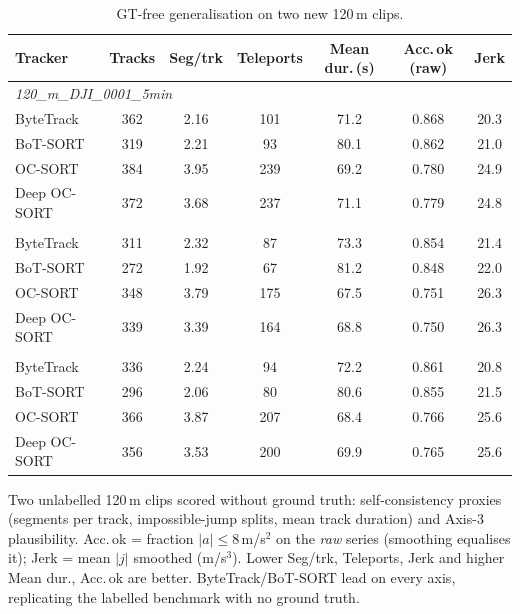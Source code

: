\begin{table}[ht]
  \centering
  \caption{GT-free generalisation on two new 120\,m clips.}
  \label{tab:gtfree}
  \begin{tabular}{lcccccc}
    \toprule
    Tracker & Tracks & Seg/trk & Teleports & Mean dur.\,(s) & Acc.\,ok (raw) & Jerk \\
    \midrule
    \multicolumn{7}{l}{\textit{120\_m\_DJI\_0001\_5min}} \\
    \quad ByteTrack & 362 & 2.16 & 101 & 71.2 & 0.868 & 20.3 \\
    \quad BoT-SORT & 319 & 2.21 & 93 & 80.1 & 0.862 & 21.0 \\
    \quad OC-SORT & 384 & 3.95 & 239 & 69.2 & 0.780 & 24.9 \\
    \quad Deep OC-SORT & 372 & 3.68 & 237 & 71.1 & 0.779 & 24.8 \\
    \addlinespace
    \multicolumn{7}{l}{\textit{120\_m\_DJI\_0041\_5min}} \\
    \quad ByteTrack & 311 & 2.32 & 87 & 73.3 & 0.854 & 21.4 \\
    \quad BoT-SORT & 272 & 1.92 & 67 & 81.2 & 0.848 & 22.0 \\
    \quad OC-SORT & 348 & 3.79 & 175 & 67.5 & 0.751 & 26.3 \\
    \quad Deep OC-SORT & 339 & 3.39 & 164 & 68.8 & 0.750 & 26.3 \\
    \addlinespace
    \multicolumn{7}{l}{\textit{ALL}} \\
    \quad ByteTrack & 336 & 2.24 & 94 & 72.2 & 0.861 & 20.8 \\
    \quad BoT-SORT & 296 & 2.06 & 80 & 80.6 & 0.855 & 21.5 \\
    \quad OC-SORT & 366 & 3.87 & 207 & 68.4 & 0.766 & 25.6 \\
    \quad Deep OC-SORT & 356 & 3.53 & 200 & 69.9 & 0.765 & 25.6 \\
    \bottomrule
  \end{tabular}
  \par\smallskip
  \footnotesize Two unlabelled 120\,m clips scored without ground truth: self-consistency proxies (segments per track, impossible-jump splits, mean track duration) and Axis-3 plausibility. Acc.\,ok = fraction $|a|\le8$\,m/s$^2$ on the \emph{raw} series (smoothing equalises it); Jerk = mean $|j|$ smoothed (m/s$^3$). Lower Seg/trk, Teleports, Jerk and higher Mean dur., Acc.\,ok are better. ByteTrack/BoT-SORT lead on every axis, replicating the labelled benchmark with no ground truth.
\end{table}
